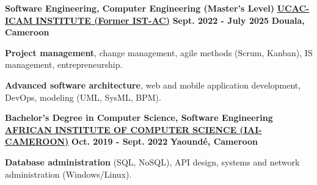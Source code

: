 

\begin{cventries}

  \cventry
    {\textbf{Software Engineering, Computer Engineering (Master's Level) }} %
    {\textbf{\href{https://ucac-icam.com/}{UCAC-ICAM INSTITUTE (Former IST-AC)}}}  %
    {\textbf{Sept. 2022 - July 2025}} %
    {\textbf{Douala, Cameroon}} %
    {
      \begin{cvitems} %
        \item {\textbf{Project management}, change management, agile methods (Scrum, Kanban), IS management, entrepreneurship.}
        \item {\textbf{Advanced software architecture}, web and mobile application development, DevOps, modeling (UML, SysML, BPM).}
      \end{cvitems}
    }


  \cventry
    {\textbf{Bachelor's Degree in Computer Science, Software Engineering} } %
    {\textbf{\href{https://www.iai-siege.com/}{AFRICAN INSTITUTE OF COMPUTER SCIENCE (IAI-CAMEROON)}}} %
    {\textbf{Oct. 2019 - Sept. 2022}} %
    {\textbf{Yaoundé, Cameroon}} %
    {
      \begin{cvitems} %
        \item {\textbf{Database administration} (SQL, NoSQL), API design, systems and network administration (Windows/Linux). }
      \end{cvitems}
    }

\end{cventries}